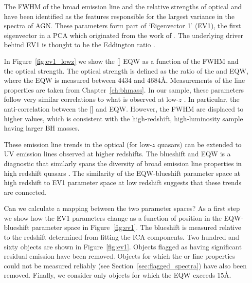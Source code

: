 The FWHM of the broad \hb emission line and the relative strengths of optical  and \hb have been identified as the features responsible for the largest variance in the spectra of AGN. 
These parameters form part of `Eigenvector 1' (EV1), the first eigenvector in a \ac{PCA} which originated from the work of \citet{boroson92}.   
The underlying driver behind EV1 is thought to be the Eddington ratio \citep[e.g.][]{sulentic00b,shen14}. 

In Figure~\ref{fig:ev1_lowz} we show the [] \ac{EQW} as a function of the \hb FWHM and the optical  strength. 
The optical  strength is defined as the ratio of the  and \hb \ac{EQW}, where the  \ac{EQW} is measured between 4434 and 4684\AA.
Measurements of the \hb line properties are taken from Chapter~\ref{ch:bhmass}. 
In our sample, these parameters follow very similar correlations to what is observed at low-$z$ \citep[see also][]{sulentic04, shen16a}.
In particular, the anti-correlation between the [] and  \ac{EQW}.  
However, the \hb FWHM are displaced to higher values, which is consistent with the high-redshift, high-luminosity sample having larger \ac{BH} masses. 

These emission line trends in the optical (for low-$z$ quasars) can be extended to UV emission lines observed at higher redshifts. 
The  blueshift and \ac{EQW} is a diagnostic that similarly spans the diversity of broad emission line properties in high redshift quasars \citep[dominated by a virialized component at one extreme and a wind driven component at the other][]{richards11,sulentic07}. 
The similarity of the  \ac{EQW}-blueshift parameter space at high redshift to \ac{EV1} parameter space at low redshift suggests that these trends are connected. 

Can we calculate a mapping between the two parameter spaces? 
As a first step we show how the \ac{EV1} parameters change as a function of position in the  \ac{EQW}-blueshift parameter space in Figure~\ref{fig:ev1}. 
The  blueshift is measured relative to the redshift determined from fitting the \ac{ICA} components.
Two hundred and sixty objects are shown in Figure~\ref{fig:ev1}.
Objects flagged as having significant  residual emission have been removed.  
Objects for which the \hb or  line properties could not be measured reliably (see Section~\ref{sec:flagged_spectra}) have also been removed. 
Finally, we consider only objects for which the  EQW exceeds 15\AA. 

